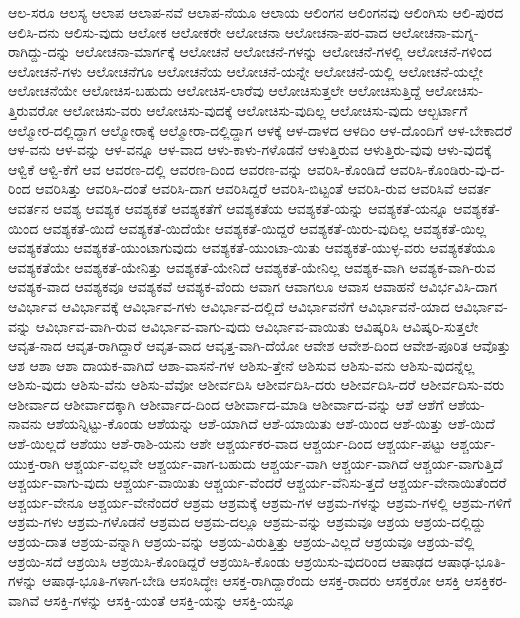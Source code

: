 {ಆಲ-ಸರೂ
ಆಲಸ್ಯ
ಆಲಾಪ
ಆಲಾಪ-ನವೆ
ಆಲಾಪ-ನೆಯೂ
ಆಲಾಯ
ಆಲಿಂಗನ
ಆಲಿಂಗನವು
ಆಲಿಂಗಿಸು
ಆಲಿ-ಪುರದ
ಆಲಿಸಿ-ದನು
ಆಲಿಸು-ವುದು
ಆಲೋಕ
ಆಲೋಕರೇ
ಆಲೋಚನಾ
ಆಲೋಚನಾ-ಪರ-ವಾದ
ಆಲೋಚನಾ-ಮಗ್ನ-ರಾಗಿದ್ದು-ದನ್ನು
ಆಲೋಚನಾ-ಮಾರ್ಗಕ್ಕೆ
ಆಲೋಚನೆ
ಆಲೋಚನೆ-ಗಳನ್ನು
ಆಲೋಚನೆ-ಗಳಲ್ಲಿ
ಆಲೋಚನೆ-ಗಳಿಂದ
ಆಲೋಚನೆ-ಗಳು
ಆಲೋಚನೆಗೂ
ಆಲೋಚನೆಯ
ಆಲೋಚನೆ-ಯನ್ನೇ
ಆಲೋಚನೆ-ಯಲ್ಲಿ
ಆಲೋಚನೆ-ಯಲ್ಲೇ
ಆಲೋಚನೆಯೇ
ಆಲೋಚಿಸ-ಬಹುದು
ಆಲೋಚಿಸ-ಲಾರೆವು
ಆಲೋಚಿಸುತ್ತಲೇ
ಆಲೋಚಿಸುತ್ತಿದ್ದೆ
ಆಲೋಚಿಸು-ತ್ತಿರುವರೋ
ಆಲೋಚಿಸು-ವರು
ಆಲೋಚಿಸು-ವುದಕ್ಕೆ
ಆಲೋಚಿಸು-ವುದಿಲ್ಲ
ಆಲೋಚಿಸು-ವುದು
ಆಲ್ಬರ್ಟಾಗೆ
ಆಲ್ಮೋರ-ದಲ್ಲಿದ್ದಾಗ
ಆಲ್ಮೋರಾಕ್ಕೆ
ಆಲ್ಮೋರಾ-ದಲ್ಲಿದ್ದಾಗ
ಆಳಕ್ಕೆ
ಆಳ-ದಾಳದ
ಆಳದಿಂ
ಆಳ-ದೊಂದಿಗೆ
ಆಳ-ಬೇಕಾದರೆ
ಆಳ-ವನು
ಆಳ-ವನ್ನು
ಆಳ-ವನ್ನೂ
ಆಳ-ವಾದ
ಆಳು-ಕಾಳು-ಗಳೊಡನೆ
ಆಳುತ್ತಿರುವ
ಆಳುತ್ತಿರು-ವುವು
ಆಳು-ವುದಕ್ಕೆ
ಆಳ್ವಿಕೆ
ಆಳ್ವಿ-ಕೆಗೆ
ಆವ
ಆವರಣ-ದಲ್ಲಿ
ಆವರಣ-ದಿಂದ
ಆವರಣ-ವನ್ನು
ಆವರಿಸಿ-ಕೊಂಡಿದೆ
ಆವರಿಸಿ-ಕೊಂಡಿರು-ವು-ದ-ರಿಂದ
ಆವರಿಸಿತ್ತು
ಆವರಿಸಿ-ದಂತೆ
ಆವರಿಸಿ-ದಾಗ
ಆವರಿಸಿದ್ದರೆ
ಆವರಿಸಿ-ಬಿಟ್ಟಂತೆ
ಆವರಿಸಿ-ರುವ
ಆವರಿಸಿವೆ
ಆವರ್ತ
ಆವರ್ತನ
ಆವಶ್ಯ
ಆವಶ್ಯಕ
ಆವಶ್ಯಕತೆ
ಆವಶ್ಯಕತೆಗೆ
ಆವಶ್ಯಕತೆಯ
ಆವಶ್ಯಕತೆ-ಯನ್ನು
ಆವಶ್ಯಕತೆ-ಯನ್ನೂ
ಆವಶ್ಯಕತೆ-ಯಿಂದ
ಆವಶ್ಯಕತೆ-ಯಿದೆ
ಆವಶ್ಯಕತೆ-ಯಿದೆಯೇ
ಆವಶ್ಯಕತೆ-ಯಿದ್ದರೆ
ಆವಶ್ಯಕತೆ-ಯಿರು-ವುದಿಲ್ಲ
ಆವಶ್ಯಕತೆ-ಯಿಲ್ಲ
ಆವಶ್ಯಕತೆಯು
ಆವಶ್ಯಕತೆ-ಯುಂಟಾಗುವುದು
ಆವಶ್ಯಕತೆ-ಯುಂಟಾ-ಯಿತು
ಆವಶ್ಯಕತೆ-ಯುಳ್ಳ-ವರು
ಆವಶ್ಯಕತೆಯೂ
ಆವಶ್ಯಕತೆಯೇ
ಆವಶ್ಯಕತೆ-ಯೇನಿತ್ತು
ಆವಶ್ಯಕತೆ-ಯೇನಿದೆ
ಆವಶ್ಯಕತೆ-ಯೇನಿಲ್ಲ
ಆವಶ್ಯಕ-ವಾಗಿ
ಆವಶ್ಯಕ-ವಾಗಿ-ರುವ
ಆವಶ್ಯಕ-ವಾದ
ಆವಶ್ಯಕವೂ
ಆವಶ್ಯಕವೆ
ಆವಶ್ಯಕ-ವೆಂದು
ಆವಾಗ
ಆವಾಗಲೂ
ಆವಾಸ
ಆವಾಹನೆ
ಆವಿರ್ಭವಿಸಿ-ದಾಗ
ಆವಿರ್ಭಾವ
ಆವಿರ್ಭಾವಕ್ಕೆ
ಆವಿರ್ಭಾವ-ಗಳು
ಆವಿರ್ಭಾವ-ದಲ್ಲಿದೆ
ಆವಿರ್ಭಾವನೆಗೆ
ಆವಿರ್ಭಾವನೆ-ಯಾದ
ಆವಿರ್ಭಾವ-ವನ್ನು
ಆವಿರ್ಭಾವ-ವಾಗಿ-ರುವ
ಆವಿರ್ಭಾವ-ವಾಗು-ವುದು
ಆವಿರ್ಭಾವ-ವಾಯಿತು
ಆವಿಷ್ಕರಿಸಿ
ಆವಿಷ್ಕರಿ-ಸುತ್ತಲೇ
ಆವೃತ-ನಾದ
ಆವೃತ-ರಾಗಿದ್ದಾರೆ
ಆವೃತ-ವಾದ
ಆವೃತ್ತ-ವಾಗಿ-ದೆಯೋ
ಆವೇಶ
ಆವೇಶ-ದಿಂದ
ಆವೇಶ-ಪೂರಿತ
ಆವೊತ್ತು
ಆಶ
ಆಶಾ
ಆಶಾ ದಾಯಕ-ವಾಗಿದೆ
ಆಶಾ-ವಾಸನೆ-ಗಳ
ಆಶಿಸು-ತ್ತೇನೆ
ಆಶಿಸುವ
ಆಶಿಸು-ವನು
ಆಶಿಸು-ವುದನ್ನೆಲ್ಲ
ಆಶಿಸು-ವುದು
ಆಶಿಸು-ವೆನು
ಆಶಿಸು-ವೆವೋ
ಆಶೀರ್ವದಿಸಿ
ಆಶೀರ್ವದಿಸಿ-ದರು
ಆಶೀರ್ವದಿಸಿ-ದರೆ
ಆಶೀರ್ವದಿಸು-ವರು
ಆಶೀರ್ವಾದ
ಆಶೀರ್ವಾದಕ್ಕಾಗಿ
ಆಶೀರ್ವಾದ-ದಿಂದ
ಆಶೀರ್ವಾದ-ಮಾಡಿ
ಆಶೀರ್ವಾದ-ವನ್ನು
ಆಶೆ
ಆಶೆಗೆ
ಆಶೆಯ-ನಾವನು
ಆಶೆಯನ್ನಿಟ್ಟು-ಕೊಂಡು
ಆಶೆಯನ್ನು
ಆಶೆ-ಯಾಗಿದೆ
ಆಶೆ-ಯಾಯಿತು
ಆಶೆ-ಯಿಂದ
ಆಶೆ-ಯಿತ್ತು
ಆಶೆ-ಯಿದೆ
ಆಶೆ-ಯಿಲ್ಲದೆ
ಆಶೆಯು
ಆಶೆ-ರಾಶಿ-ಯನು
ಆಶೇ
ಆಶ್ಚರ್ಯಕರ-ವಾದ
ಆಶ್ಚರ್ಯ-ದಿಂದ
ಆಶ್ಚರ್ಯ-ಪಟ್ಟು
ಆಶ್ಚರ್ಯ-ಯುಕ್ತ-ರಾಗಿ
ಆಶ್ಚರ್ಯ-ವಲ್ಲವೇ
ಆಶ್ಚರ್ಯ-ವಾಗ-ಬಹುದು
ಆಶ್ಚರ್ಯ-ವಾಗಿ
ಆಶ್ಚರ್ಯ-ವಾಗಿದೆ
ಆಶ್ಚರ್ಯ-ವಾಗುತ್ತಿದೆ
ಆಶ್ಚರ್ಯ-ವಾಗು-ವುದು
ಆಶ್ಚರ್ಯ-ವಾಯಿತು
ಆಶ್ಚರ್ಯ-ವೆಂದರೆ
ಆಶ್ಚರ್ಯ-ವೆನಿಸು-ತ್ತದೆ
ಆಶ್ಚರ್ಯ-ವೇನಾಯಿತೆಂದರೆ
ಆಶ್ಚರ್ಯ-ವೇನೂ
ಆಶ್ಚರ್ಯ-ವೇನೆಂದರೆ
ಆಶ್ರಮ
ಆಶ್ರಮಕ್ಕೆ
ಆಶ್ರಮ-ಗಳ
ಆಶ್ರಮ-ಗಳನ್ನು
ಆಶ್ರಮ-ಗಳಲ್ಲಿ
ಆಶ್ರಮ-ಗಳಿಗೆ
ಆಶ್ರಮ-ಗಳು
ಆಶ್ರಮ-ಗಳೊಡನೆ
ಆಶ್ರಮದ
ಆಶ್ರಮ-ದಲ್ಲೂ
ಆಶ್ರಮ-ವನ್ನು
ಆಶ್ರಮವೂ
ಆಶ್ರಯ
ಆಶ್ರಯ-ದಲ್ಲಿದ್ದು
ಆಶ್ರಯ-ದಾತ
ಆಶ್ರಯ-ವನ್ನಾಗಿ
ಆಶ್ರಯ-ವನ್ನು
ಆಶ್ರಯ-ವಿರುತ್ತಿತ್ತು
ಆಶ್ರಯ-ವಿಲ್ಲದೆ
ಆಶ್ರಯವೂ
ಆಶ್ರಯ-ವೆಲ್ಲಿ
ಆಶ್ರಯಿ-ಸದೆ
ಆಶ್ರಯಿಸಿ
ಆಶ್ರಯಿಸಿ-ಕೊಂಡಿದ್ದರೆ
ಆಶ್ರಯಿಸಿ-ಕೊಂಡು
ಆಶ್ರಯಿಸು-ವುದರಿಂದ
ಆಷಾಢದ
ಆಷಾಢ-ಭೂತಿ-ಗಳನ್ನು
ಆಷಾಢ-ಭೂತಿ-ಗಳಾಗ-ಬೇಡಿ
ಆಸಂಸಿದ್ಧೇಃ
ಆಸಕ್ತ-ರಾಗಿದ್ದಾರೆಂದು
ಆಸಕ್ತ-ರಾದರು
ಆಸಕ್ತರೋ
ಆಸಕ್ತಿ
ಆಸಕ್ತಿಕರ-ವಾಗಿವೆ
ಆಸಕ್ತಿ-ಗಳನ್ನು
ಆಸಕ್ತಿ-ಯಂತೆ
ಆಸಕ್ತಿ-ಯನ್ನು
ಆಸಕ್ತಿ-ಯನ್ನೂ
}
